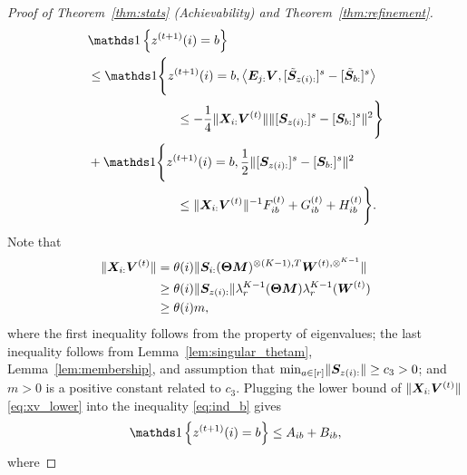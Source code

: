 \documentclass[journal]{IEEEtran}
\theoremstyle{definition}
\theoremstyle{definition}
\newcommand{\offf}[1]{\left\{#1\right\}}
\newcommand{\ang}[1]{\left\langle#1\right\rangle}
\begin{document}
\begin{proof}[Proof of Theorem~\ref{thm:stats} (Achievability) and Theorem~\ref{thm:refinement}]
   \vspace{-0.5cm}
   \small
    \begin{align}
         & \ind \offf{ z^{(t+1)}(i) = b  }\\
         & \leq \ind \Bigg\{ z^{(t+1)}(i) = b ,   \ang{ \mE_{j:} \mV, [  \tilde \mS_{z(i):} ]^s - [  \tilde \mS_{b:} ]^s }  \\
         & \quad \quad \quad \quad \quad \quad \quad  \leq - \frac{1}{4} \onormSize{}{\mX_{i:} \mV^{(t)}} \onormSize{}{ [ \mS_{z(i):}  ]^s - [ \mS_{b:}  ]^s  }^2 \Bigg\} \\
         & + \ind \Bigg\{z^{(t+1)}(i) = b, \frac{1}{2}\onormSize{}{ [ \mS_{z(i):}  ]^s - [ \mS_{b:}  ]^s  }^2 \\
         & \quad \quad \quad \quad \quad \quad \quad \leq \onormSize{}{\mX_{i:} \mV^{(t)}}^{-1} F_{ib}^{(t)} + G_{ib}^{(t)} + H_{ib}^{(t)} \Bigg\}. \label{eq:ind_b}
    \end{align}
    \normalsize
   Note that 
    \begin{align}
     \onormSize{}{\mX_{i:} \mV^{(t)}}  &= \theta(i) \onormSize{}{\mS_{i:} (\mTheta \mM)^{\otimes (K-1),T} \mW^{(t), \otimes^{K-1}}}\\
         &\geq \theta(i) \onormSize{}{\mS_{z(i):}} \lambda_r^{K-1}(\mTheta \mM) \lambda^{K-1}_r(\mW^{(t)})\\
         &\geq\theta(i) m , \label{eq:xv_lower}
    \end{align}
    where the first inequality follows from the property of eigenvalues; the last inequality follows from Lemma~\ref{lem:singular_thetam}, Lemma~\ref{lem:membership}, and assumption that $\min_{a \in [r]} \lVert\bm S_{z(i):}\rVert \geq c_3>0$; and $m >0$ is a positive constant related to $ c_3$. Plugging the lower bound of $ \lVert\bm X_{i:} \bm{V}^{(t)}\rVert$ \eqref{eq:xv_lower} into the inequality \eqref{eq:ind_b} gives
    \begin{equation}\label{eq:decomp1}
        \ind \offf{ z^{(t+1)}(i) = b  } \leq A_{ib} + B_{ib},
    \end{equation}
    where 


\end{proof}
\end{document}
